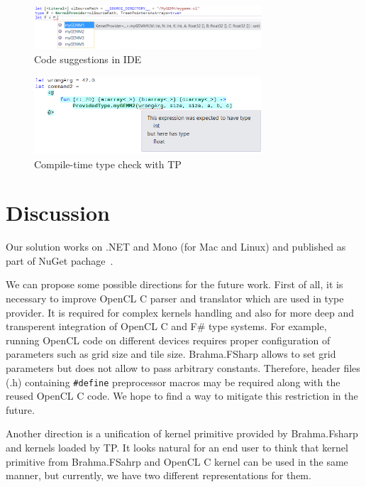 \documentclass[sigplan,review]{acmart}\settopmatter{printfolios=true}
\begin{document}
\begin{figure}[h]
\centering
\includegraphics[width=8.5cm]{graphics/example-multiple-suggestions.png}
\caption{Code suggestions in IDE}
\label{pic:suggestions}
\end{figure}

\begin{figure}[h]
\centering
\includegraphics[width=8.5cm]{graphics/example-compile-error.png}
\caption{Compile-time type check with TP}
\label{pic:error}
\end{figure}

\section{Discussion}
                                                                                                                                                                                
Our solution works on .NET and Mono (for Mac and Linux) and published as part of NuGet pachage~\cite{Brahma.FSahrp.NuGet}.

We can propose some possible directions for the future work. First of all, it is necessary to improve OpenCL C parser and translator which are used in type provider.
It is required for complex kernels handling and also for more deep and transperent integration of OpenCL C and F\# type systems.
For example, running OpenCL code on different devices requires proper configuration of parameters such as grid size and tile size. 
Brahma.FSharp allows to set grid parameters but does not allow to pass arbitrary constants. 
Therefore, header files (.h) containing \lstinline{#define} preprocessor macros may be required along with the reused OpenCL C code. 
We hope to find a way to mitigate this restriction in the future.

Another direction is a unification of kernel primitive provided by Brahma.Fsharp and kernels loaded by TP.
It looks natural for an end user to think that kernel primitive from Brahma.FSahrp and OpenCL C kernel can be used in the same manner, but currently, we have two different representations for them.
\end{document}
